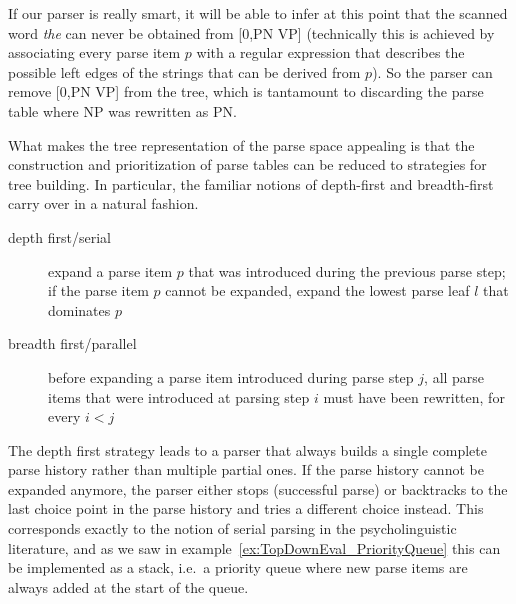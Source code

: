 \begin{examplebox}
\begin{center}
\end{center}
%
If our parser is really smart, it will be able to infer at this point that the scanned word \emph{the} can never be obtained from [0,PN VP] (technically this is achieved by associating every parse item $p$ with a regular expression that describes the possible left edges of the strings that can be derived from $p$).
So the parser can remove [0,PN VP] from the tree, which is tantamount to discarding the parse table where NP was rewritten as PN\@.
%
\begin{center}
\end{center}

\end{examplebox}

What makes the tree representation of the parse space appealing is that the construction and prioritization of parse tables can be reduced to strategies for tree building.
In particular, the familiar notions of depth-first and breadth-first carry over in a natural fashion.
%
\begin{description}
    \item[depth first/serial] expand a parse item $p$ that was introduced during the previous parse step; if the parse item $p$ cannot be expanded, expand the lowest parse leaf $l$ that dominates $p$
    \item[breadth first/parallel] before expanding a parse item introduced during parse step $j$, all parse items that were introduced at parsing step $i$ must have been rewritten, for every $i < j$
\end{description}
%
The depth first strategy leads to a parser that always builds a single complete parse history rather than multiple partial ones.
If the parse history cannot be expanded anymore, the parser either stops (successful parse) or backtracks to the last choice point in the parse history and tries a different choice instead.
This corresponds exactly to the notion of serial parsing in the psycholinguistic literature, and as we saw in example~\ref{ex:TopDownEval_PriorityQueue} this can be implemented as a stack, i.e.\ a priority queue where new parse items are always added at the start of the queue.

